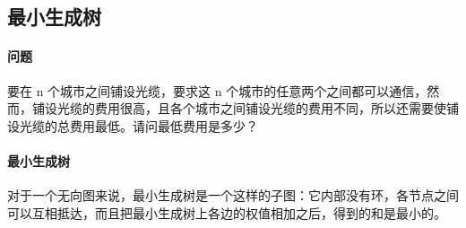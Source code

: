 \subsection{最小生成树}
	\paragraph{问题} 要在 n 个城市之间铺设光缆，要求这 n 个城市的任意两个之间都可以通信，然而，铺设光缆的费用很高，且各个城市之间铺设光缆的费用不同，所以还需要使铺设光缆的总费用最低。请问最低费用是多少？
	
	\paragraph{最小生成树} 对于一个无向图来说，最小生成树是一个这样的子图：它内部没有环，各节点之间可以互相抵达，而且把最小生成树上各边的权值相加之后，得到的和是最小的。

    
    
